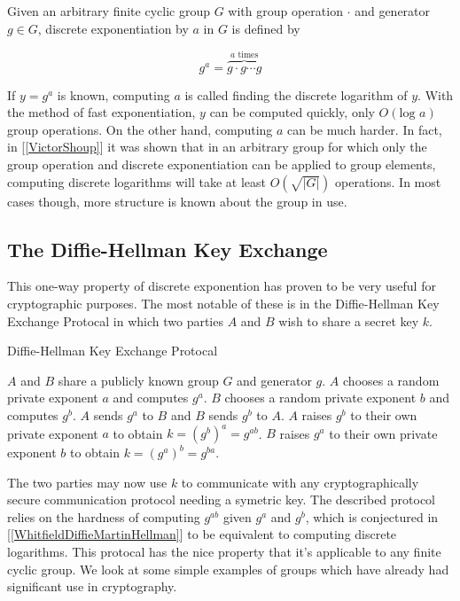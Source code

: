 
Given an arbitrary finite cyclic group $G$ with group operation $\cdot$ and generator $g \in G$, discrete exponentiation by $a$ in $G$ is defined by 

$$
g^a = \overbrace{g \cdot g \cdots g}^{a \text{ times}}
$$

If $y = g^a$ is known, computing $a$ is called finding the discrete logarithm of $y$. With the method of fast exponentiation, $y$ can be computed quickly, only $O(\text{log } a)$ group operations. On the other hand, computing $a$ can be much harder. In fact, in [\ref{VictorShoup}] it was shown that in an arbitrary group for which only the group operation and discrete exponentiation can be applied to group elements, computing discrete logarithms will take at least $O(\sqrt{|G|})$ operations. In most cases though, more structure is known about the group in use.  

\subsection{The Diffie-Hellman Key Exchange}

This one-way property of discrete exponention has proven to be very useful for cryptographic purposes. The most notable of these is in the Diffie-Hellman Key Exchange Protocal in which two parties $A$ and $B$ wish to share a secret key $k$.

\begin{algorithm} 
	\caption{Diffie-Hellman Key Exchange Protocal}
	\begin{algorithmic}[1]
		\State $A$ and $B$ share a publicly known group $G$ and generator $g$.
		\State $A$ chooses a random private exponent $a$ and computes $g^a$.
		\State $B$ chooses a random private exponent $b$ and computes $g^b$.
		\State $A$ sends $g^a$ to $B$ and $B$ sends $g^b$ to $A$. 
		\State $A$ raises $g^b$ to their own private exponent $a$ to obtain $k = (g^b)^a = g^{ab}$.
		\State $B$ raises $g^a$ to their own private exponent $b$ to obtain $k = (g^a)^b = g^{ba}$.
	\end{algorithmic} 
\end{algorithm}  


The two parties may now use $k$ to communicate with any cryptographically secure communication protocol needing a symetric key. The described protocol relies on the hardness of computing $g^{ab}$ given $g^a$ and $g^b$, which is conjectured in [\ref{WhitfieldDiffieMartinHellman}] to be equivalent to computing discrete logarithms. This protocal has the nice property that it's applicable to any finite cyclic group. We look at some simple examples of groups which have already had significant use in cryptography.  

